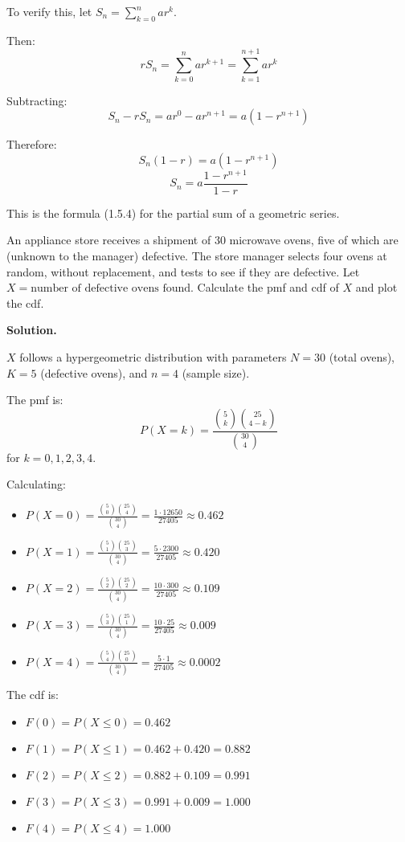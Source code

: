 To verify this, let $S_n = \sum_{k=0}^{n} ar^k$.

Then:
\[ rS_n = \sum_{k=0}^{n} ar^{k+1} = \sum_{k=1}^{n+1} ar^k \]

Subtracting:
\[ S_n - rS_n = ar^0 - ar^{n+1} = a(1 - r^{n+1}) \]

Therefore:
\[ S_n(1 - r) = a(1 - r^{n+1}) \]
\[ S_n = a \frac{1 - r^{n+1}}{1 - r} \]

This is the formula (1.5.4) for the partial sum of a geometric series.


\begin{problembox}
An appliance store receives a shipment of 30 microwave ovens, five of which are (unknown to the manager) defective. The store manager selects four ovens at random, without replacement, and tests to see if they are defective. Let $X=\text{number of defective ovens found}$. Calculate the pmf and cdf of $X$ and plot the cdf.
\end{problembox}

\noindent\textbf{Solution.}

$X$ follows a hypergeometric distribution with parameters $N = 30$ (total ovens), $K = 5$ (defective ovens), and $n = 4$ (sample size).

The pmf is:
\[ P(X = k) = \frac{\binom{5}{k} \binom{25}{4-k}}{\binom{30}{4}} \]
for $k = 0, 1, 2, 3, 4$.

Calculating:
\begin{itemize}
\item $P(X = 0) = \frac{\binom{5}{0} \binom{25}{4}}{\binom{30}{4}} = \frac{1 \cdot 12650}{27405} \approx 0.462$
\item $P(X = 1) = \frac{\binom{5}{1} \binom{25}{3}}{\binom{30}{4}} = \frac{5 \cdot 2300}{27405} \approx 0.420$
\item $P(X = 2) = \frac{\binom{5}{2} \binom{25}{2}}{\binom{30}{4}} = \frac{10 \cdot 300}{27405} \approx 0.109$
\item $P(X = 3) = \frac{\binom{5}{3} \binom{25}{1}}{\binom{30}{4}} = \frac{10 \cdot 25}{27405} \approx 0.009$
\item $P(X = 4) = \frac{\binom{5}{4} \binom{25}{0}}{\binom{30}{4}} = \frac{5 \cdot 1}{27405} \approx 0.0002$
\end{itemize}

The cdf is:
\begin{itemize}
\item $F(0) = P(X \leq 0) = 0.462$
\item $F(1) = P(X \leq 1) = 0.462 + 0.420 = 0.882$
\item $F(2) = P(X \leq 2) = 0.882 + 0.109 = 0.991$
\item $F(3) = P(X \leq 3) = 0.991 + 0.009 = 1.000$
\item $F(4) = P(X \leq 4) = 1.000$
\end{itemize}

